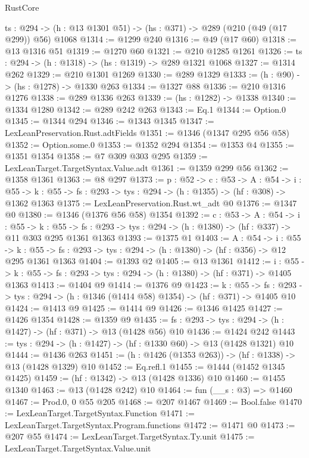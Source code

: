 \begin{lexlean}{RustCore}
\begin{coremodule}
  {ts : @294} -> (h : @13 @1301 @51) -> (hs : @371) -> @289 (@210 (@49 (@17 @299)) @56) @1068
@1314 := @1299 @240
@1316 := @49 (@17 @60)
@1318 := @13 @1316 @51
@1319 := @1270 @60
@1321 := @210 @1285 @1261
@1326 := {ts : @294} -> (h : @1318) -> (hs : @1319) -> @289 @1321 @1068
@1327 := @1314 @262
@1329 := @210 @1301 @1269
@1330 := @289 @1329
@1333 := (h : @90) -> (hs : @1278) -> @1330 @263
@1334 := @1327 @88
@1336 := @210 @1316 @1276
@1338 := @289 @1336 @263
@1339 := (hs : @1282) -> @1338
@1340 := @1334 @1280
@1342 := @289 @242 @263
@1343 := Eq.{1}
@1344 := Option.{0}
@1345 := @1344 @294
@1346 := @1343 @1345
@1347 := LexLeanPreservation.Rust.adtFields
@1351 := @1346 (@1347 @295 @56 @58)
@1352 := Option.some.{0}
@1353 := @1352 @294
@1354 := @1353 @4
@1355 := @1351 @1354
@1358 := @7 @309 @303 @295
@1359 := LexLeanTarget.TargetSyntax.Value.adt
@1361 := @1359 @299 @56
@1362 := @1358 @1361
@1363 := @8 @297
@1373 := {p : @52} ->
  {c : @53} ->
  {A : @54} ->
  {i : @55} -> {k : @55} -> {fs : @293} -> {tys : @294} -> (h : @1355) -> (hf : @308) -> @1362 @1363
@1375 := LexLeanPreservation.Rust.wt_adt @0
@1376 := @1347 @0
@1380 := @1346 (@1376 @56 @58) @1354
@1392 := {c : @53} ->
  {A : @54} ->
  {i : @55} ->
  {k : @55} ->
  {fs : @293} -> {tys : @294} -> (h : @1380) -> (hf : @337) -> @11 @303 @295 @1361 @1363
@1393 := @1375 @1
@1403 := {A : @54} ->
  {i : @55} ->
  {k : @55} -> {fs : @293} -> {tys : @294} -> (h : @1380) -> (hf : @356) -> @12 @295 @1361 @1363
@1404 := @1393 @2
@1405 := @13 @1361
@1412 := {i : @55} ->
  {k : @55} -> {fs : @293} -> {tys : @294} -> (h : @1380) -> (hf : @371) -> @1405 @1363
@1413 := @1404 @9
@1414 := @1376 @9
@1423 := {k : @55} ->
  {fs : @293} -> {tys : @294} -> (h : @1346 (@1414 @58) @1354) -> (hf : @371) -> @1405 @10
@1424 := @1413 @9
@1425 := @1414 @9
@1426 := @1346 @1425
@1427 := @1426 @1354
@1428 := @1359 @9
@1435 := {fs : @293} -> {tys : @294} -> (h : @1427) -> (hf : @371) -> @13 (@1428 @56) @10
@1436 := @1424 @242
@1443 := {tys : @294} -> (h : @1427) -> (hf : @1330 @60) -> @13 (@1428 @1321) @10
@1444 := @1436 @263
@1451 := (h : @1426 (@1353 @263)) -> (hf : @1338) -> @13 (@1428 @1329) @10
@1452 := Eq.refl.{1}
@1455 := @1444 (@1452 @1345 @1425)
@1459 := (hf : @1342) -> @13 (@1428 @1336) @10
@1460 := @1455 @1340
@1463 := @13 (@1428 @242) @10
@1464 := fun (__s : @3) => @1460
@1467 := Prod.{0, 0} @55 @205
@1468 := @207 @1467
@1469 := Bool.false
@1470 := LexLeanTarget.TargetSyntax.Function
@1471 := LexLeanTarget.TargetSyntax.Program.functions
@1472 := @1471 @0
@1473 := @207 @55
@1474 := LexLeanTarget.TargetSyntax.Ty.unit
@1475 := LexLeanTarget.TargetSyntax.Value.unit

\end{coremodule}
\end{lexlean}
